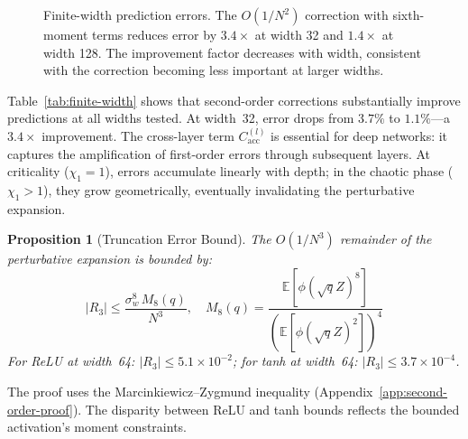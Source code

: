 \documentclass[10pt]{article}
\newcommand{\EE}{\mathbb{E}}
\newtheorem{proposition}[theorem]{Proposition}
\begin{document}
\begin{figure}[t]
\centering
{}
\caption{Finite-width prediction errors. The $O(1/N^2)$ correction with sixth-moment terms reduces error by $3.4\times$ at width 32 and $1.4\times$ at width 128. The improvement factor decreases with width, consistent with the correction becoming less important at larger widths.}
\label{fig:finite-width}
\end{figure}

Table~\ref{tab:finite-width} shows that second-order corrections substantially improve predictions at all widths tested.
At width~32, error drops from $3.7\%$ to $1.1\%$---a $3.4\times$ improvement.
The cross-layer term $C_{\mathrm{acc}}^{(l)}$ is essential for deep networks: it captures the amplification of first-order errors through subsequent layers.
At criticality ($\chi_1 = 1$), errors accumulate linearly with depth; in the chaotic phase ($\chi_1 > 1$), they grow geometrically, eventually invalidating the perturbative expansion.

\begin{proposition}[Truncation Error Bound]
\label{prop:truncation-bound}
The $O(1/N^3)$ remainder of the perturbative expansion is bounded by:
\begin{equation}
    |R_3| \leq \frac{\sigma_w^8\, M_8(q)}{N^3}, \quad M_8(q) = \frac{\EE[\phi(\sqrt{q}Z)^8]}{(\EE[\phi(\sqrt{q}Z)^2])^4}
    \label{eq:truncation-bound}
\end{equation}
For ReLU at width~64: $|R_3| \leq 5.1 \times 10^{-2}$; for tanh at width~64: $|R_3| \leq 3.7 \times 10^{-4}$.
\end{proposition}

The proof uses the Marcinkiewicz--Zygmund inequality (Appendix~\ref{app:second-order-proof}).
The disparity between ReLU and tanh bounds reflects the bounded activation's moment constraints.
\end{document}
